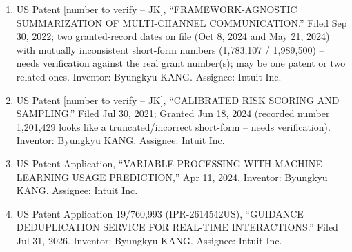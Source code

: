 \documentclass[10pt]{article}
\makeatletter
\newlength{\bibhang}
\newlength{\bibsep}
 {\@listi \global\bibsep\itemsep \global\advance\bibsep by\parsep}
\newenvironment{bibsection}%
        {\begin{enumerate}{}{%
       \setlength{\leftmargin}{\bibhang}%
       \setlength{\itemindent}{-\leftmargin}%
       \setlength{\itemsep}{\bibsep}%
       \setlength{\parsep}{\z@}%
        \setlength{\partopsep}{0pt}%
        \setlength{\topsep}{0pt}}}
        {\end{enumerate}\vspace{-.6\baselineskip}}
\makeatother
\begin{document}
\begin{bibsection}
    \item[--] US Patent [number to verify -- JK], ``FRAMEWORK-AGNOSTIC SUMMARIZATION OF MULTI-CHANNEL COMMUNICATION.'' Filed Sep 30, 2022; two granted-record dates on file (Oct 8, 2024 and May 21, 2024) with mutually inconsistent short-form numbers (1,783,107 / 1,989,500) -- needs verification against the real grant number(s); may be one patent or two related ones. Inventor: Byungkyu KANG. Assignee: Intuit Inc.

    \item[--] US Patent [number to verify -- JK], ``CALIBRATED RISK SCORING AND SAMPLING.'' Filed Jul 30, 2021; Granted Jun 18, 2024 (recorded number 1,201,429 looks like a truncated/incorrect short-form -- needs verification). Inventor: Byungkyu KANG. Assignee: Intuit Inc.

    \item[--] US Patent Application, ``VARIABLE PROCESSING WITH MACHINE LEARNING USAGE PREDICTION,'' Apr 11, 2024. Inventor: Byungkyu KANG. Assignee: Intuit Inc.

    \item[--] US Patent Application 19/760,993 (IPR-2614542US), ``GUIDANCE DEDUPLICATION SERVICE FOR REAL-TIME INTERACTIONS.'' Filed Jul 31, 2026. Inventor: Byungkyu KANG. Assignee: Intuit Inc.


   

   
   
\end{bibsection} 
\end{document}
